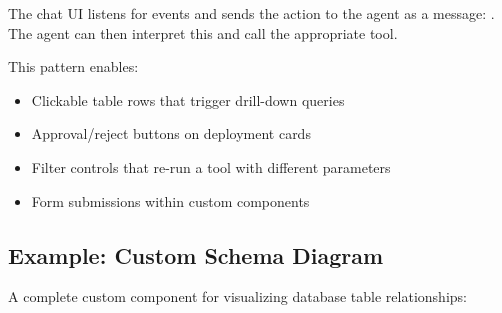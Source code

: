 The chat UI listens for  events and sends the action to the agent as a message: . The agent can then interpret this and call the appropriate tool.

This pattern enables:
\begin{itemize}
    \item Clickable table rows that trigger drill-down queries
    \item Approval/reject buttons on deployment cards
    \item Filter controls that re-run a tool with different parameters
    \item Form submissions within custom components
\end{itemize}

\subsection{Example: Custom Schema Diagram}

A complete custom component for visualizing database table relationships:


